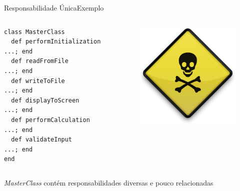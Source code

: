 \documentclass[10pt]{beamer}
\begin{document}
\begin{frame}[fragile]{Responsabilidade Única}{Exemplo}
\begin{columns}

\begin{column}{0.8\textwidth}
\begin{lstlisting}
class MasterClass
  def performInitialization ...; end
  def readFromFile          ...; end
  def writeToFile           ...; end
  def displayToScreen       ...; end
  def performCalculation    ...; end
  def validateInput         ...; end
end
\end{lstlisting}
\end{column}

\pause

\begin{column}{0.1\textwidth}
  \begin{figure}
    \includegraphics[width=1.5\textwidth]{images/toxicSign.png}
  \end{figure}
\end{column}

\end{columns}

\textit{MasterClass} contém responsabilidades diversas e pouco relacionadas

\end{frame}
\end{document}
